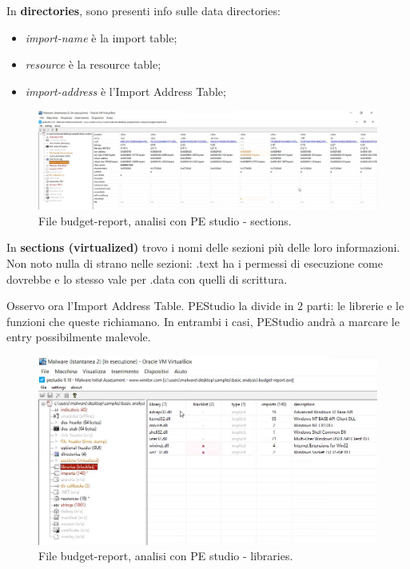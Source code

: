 \documentclass[a4paper]{book}
\begin{document}
In \textbf{directories}, sono presenti info sulle data directories:
\begin{itemize}
    \item \textit{import-name} è la import table;
    \item \textit{resource} è la resource table;
    \item \textit{import-address} è l'Import Address Table;
\end{itemize}

\begin{figure}[p]
    \includegraphics[width=1\textwidth]{images/13-10/5.png}
    \caption{File budget-report, analisi con PE studio - sections.}
\end{figure}

In \textbf{sections (virtualized)} trovo i nomi delle sezioni più delle loro informazioni. Non noto nulla di strano nelle sezioni: .text ha i permessi di esecuzione come dovrebbe e lo stesso vale per .data con quelli di scrittura.

Osservo ora l'Import Address Table. PEStudio la divide in 2 parti: le librerie e le funzioni che queste richiamano. In entrambi i casi, PEStudio andrà a marcare le entry possibilmente malevole.

\begin{figure}[p]
    \includegraphics[width=1\textwidth]{images/13-10/6.png}
    \caption{File budget-report, analisi con PE studio - libraries.}
\end{figure}
\end{document}
